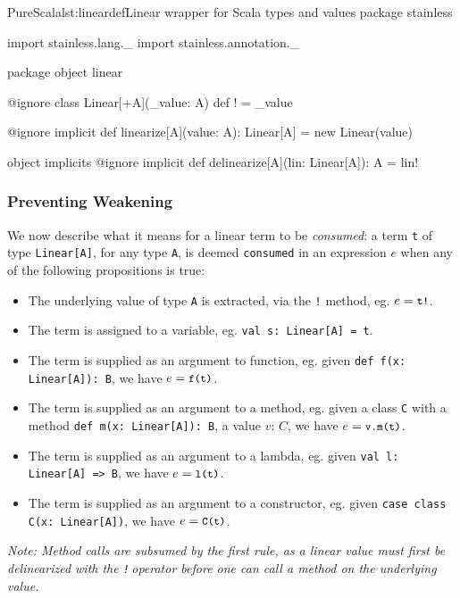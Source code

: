 \documentclass[a4paper,twoside]{article}
\newcommand{\stt}[1]{\texttt{\small{#1}}}
\begin{document}
\begin{Code}{PureScala}{lst:lineardef}{Linear wrapper for Scala types and values}
package stainless

import stainless.lang._
import stainless.annotation._

package object linear {

  @ignore
  class Linear[+A](_value: A) {
    def ! = _value
  }
  
  @ignore
  implicit def linearize[A](value: A): Linear[A] = new Linear(value)
  
  object implicits {
    @ignore
    implicit def delinearize[A](lin: Linear[A]): A = lin!
  }
}
\end{Code}

\subsubsection*{Preventing Weakening}

We now describe what it means for a linear term to be \textit{consumed}: a term \stt{t} of type \stt{Linear[A]}, for any type \stt{A}, is deemed \stt{consumed} in an expression $e$ when any of the following propositions is true:

\begin{itemize}
\item The underlying value of type \stt{A} is extracted, via the \stt{!} method, eg. $e = \stt{t!}$.
\item The term is assigned to a variable, eg. \stt{val s:\,Linear[A] = t}.
\item The term is supplied as an argument to function, eg. given \stt{def f(x:\,Linear[A]):\,B}, we have $e = \stt{f(t)}$.
\item The term is supplied as an argument to a method, eg. given a class \stt{C} with a method \stt{def m(x:\,Linear[A]):\,B}, a value $v:\, C$, we have $e = \stt{v.m(t)}$.
\item The term is supplied as an argument to a lambda, eg. given \stt{val l:\,Linear[A] => B}, we have $e = \stt{l(t)}$.
\item The term is supplied as an argument to a constructor, eg. given \stt{case class C(x: Linear[A])}, we have $e = \stt{C(t)}$.
\end{itemize}

\textit{Note: Method calls are subsumed by the first rule, as a linear value must first be delinearized with the \stt{!}\,operator before one can call a method on the underlying value.}\\
\end{document}
